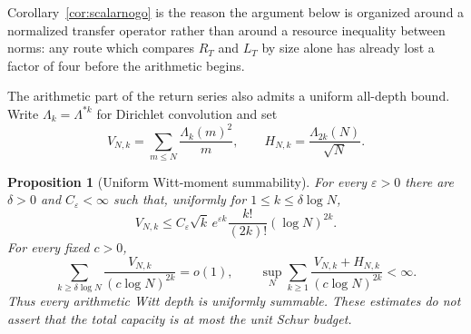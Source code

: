\documentclass[11pt]{amsart}
\newtheorem{proposition}[theorem]{Proposition}
\theoremstyle{definition}
\theoremstyle{remark}
\begin{document}
Corollary~\ref{cor:scalarnogo} is the reason the argument below is organized
around a normalized transfer operator rather than around a resource
inequality between norms: any route which compares \(R_T\) and \(L_T\) by
size alone has already lost a factor of four before the arithmetic begins.

The arithmetic part of the return series also admits a uniform all-depth
bound.  Write \(\Lambda_k=\Lambda^{*k}\) for Dirichlet convolution and set
\[
 V_{N,k}=\sum_{m\le N}\frac{\Lambda_k(m)^2}{m},\qquad
 H_{N,k}=\frac{\Lambda_{2k}(N)}{\sqrt N}.
\]

\begin{proposition}[Uniform Witt-moment summability]
\label{prop:uniformWittmoments}
For every \(\varepsilon>0\) there are \(\delta>0\) and
\(C_\varepsilon<\infty\) such that, uniformly for
\(1\le k\le\delta\log N\),
\begin{equation}\label{eq:uniformWittsmall}
 V_{N,k}\le C_\varepsilon\sqrt{k}\,e^{\varepsilon k}
 \frac{k!}{(2k)!}(\log N)^{2k}.
\end{equation}
For every fixed \(c>0\),
\begin{equation}\label{eq:uniformWittlarge}
 \sum_{k\ge\delta\log N}\frac{V_{N,k}}{(c\log N)^{2k}}=o(1),
 \qquad
 \sup_N\sum_{k\ge1}\frac{V_{N,k}+H_{N,k}}{(c\log N)^{2k}}<\infty.
\end{equation}
Thus every arithmetic Witt depth is uniformly summable.  These estimates
do not assert that the total capacity is at most the unit Schur budget.
\end{proposition}
\end{document}
